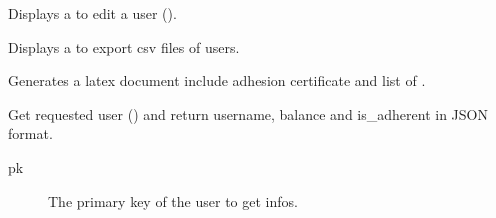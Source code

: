 \documentclass[letterpaper,10pt,english]{sphinxmanual}
\begin{document}
\begin{fulllineitems}
\label{\detokenize{modules/views:users.views.editUser}}
Displays a {\hyperref[\detokenize{modules/forms:users.forms.CreateUserForm}]{}} to edit a user ().

\end{fulllineitems}


\begin{fulllineitems}
\label{\detokenize{modules/views:users.views.export_csv}}
Displays a {\hyperref[\detokenize{modules/forms:users.forms.ExportForm}]{}} to export csv files of users.

\end{fulllineitems}


\begin{fulllineitems}
\label{\detokenize{modules/views:users.views.gen_user_infos}}
Generates a latex document include adhesion certificate and list of .

\end{fulllineitems}


\begin{fulllineitems}
\label{\detokenize{modules/views:users.views.getUser}}
Get requested user () and return username, balance and is\_adherent in JSON format.
\begin{description}
\item[{pk}] \leavevmode
The primary key of the user to get infos.

\end{description}

\end{fulllineitems}
\end{document}
